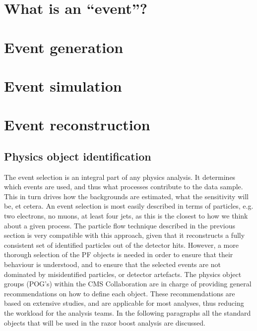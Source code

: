 \section{What is an ``event''? \label{sec:event}}




\section{Event generation \label{sec:event_generation}}




\section{Event simulation \label{sec:event_simulation}}




\section{Event reconstruction \label{sec:event_reconstruction}}




\subsection{Physics object identification \label{sec:event_objects}}

The event selection is an integral part of any physics analysis. It determines which events are
used, and thus what processes contribute to the data sample. This in turn drives how the
backgrounds are estimated, what the sensitivity will be, et cetera. 
An event selection is most easily described in terms of particles, e.g. two electrons, no muons, at
least four jets, as this is the closest to how we think about a given process.  
The particle flow technique described in the previous section is very compatible with this approach,
given that it reconstructs a fully consistent set of identified particles out of the detector hits. 
However, a more thorough selection of the PF objects is needed in order to ensure that their
behaviour is understood, and to ensure that the selected events are not dominated by
misidentified particles, or detector artefacts. 
The physics object groups (POG's) within the CMS Collaboration are in charge of providing general
recommendations on how to define each object. These recommendations are based on extensive studies,
and are applicable for most analyses, thus reducing the workload for the analysis teams.
In the following paragraphs all the standard objects that will be used in the razor boost analysis
are discussed.


